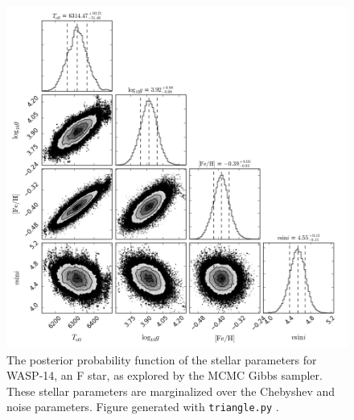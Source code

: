 \documentclass[iop,floatfix]{emulateapj}
\begin{document}
\begin{figure}[!htb]
\begin{center}
  \includegraphics[width=5in]{figs/stellar_triangle_Kurucz.png}
  \caption{The posterior probability function of the stellar parameters for WASP-14, an F star, as explored by the MCMC Gibbs sampler. These stellar parameters are marginalized over the Chebyshev and noise parameters. Figure generated with \texttt{triangle.py} \citep{foreman-mackey14}.
}
\label{fig:stellar_posterior}
\end{center}
\end{figure}
\end{document}
